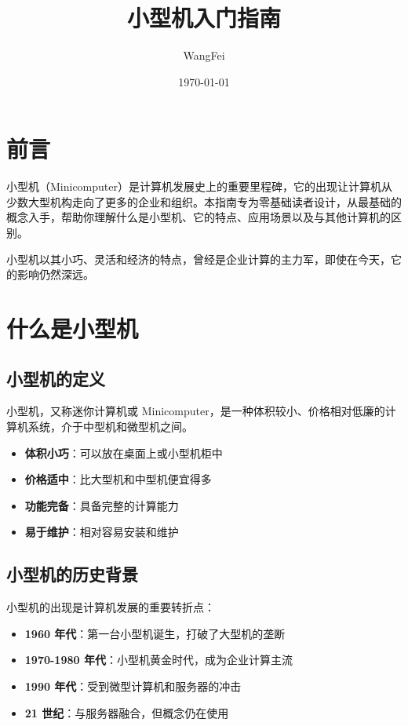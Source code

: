 \documentclass[12pt,UTF8]{ctexbook}
\title{\heiti\zihao{0} 小型机入门指南}
\author{WangFei}
\date{\today}
\begin{document}
\maketitle
\tableofcontents

\frontmatter
\chapter{前言}

小型机（Minicomputer）是计算机发展史上的重要里程碑，它的出现让计算机从少数大型机构走向了更多的企业和组织。本指南专为零基础读者设计，从最基础的概念入手，帮助你理解什么是小型机、它的特点、应用场景以及与其他计算机的区别。

小型机以其小巧、灵活和经济的特点，曾经是企业计算的主力军，即使在今天，它的影响仍然深远。

\mainmatter

\chapter{什么是小型机}
\label{chap:what_is_minicomputer}

\section{小型机的定义}

小型机，又称迷你计算机或 Minicomputer，是一种体积较小、价格相对低廉的计算机系统，介于中型机和微型机之间。

\begin{itemize}[leftmargin=2cm]
    \item \textbf{体积小巧}：可以放在桌面上或小型机柜中
    \item \textbf{价格适中}：比大型机和中型机便宜得多
    \item \textbf{功能完备}：具备完整的计算能力
    \item \textbf{易于维护}：相对容易安装和维护
\end{itemize}

\section{小型机的历史背景}

小型机的出现是计算机发展的重要转折点：

\begin{itemize}[leftmargin=2cm]
    \item \textbf{1960 年代}：第一台小型机诞生，打破了大型机的垄断
    \item \textbf{1970-1980 年代}：小型机黄金时代，成为企业计算主流
    \item \textbf{1990 年代}：受到微型计算机和服务器的冲击
    \item \textbf{21 世纪}：与服务器融合，但概念仍在使用
\end{itemize}
\end{document}

